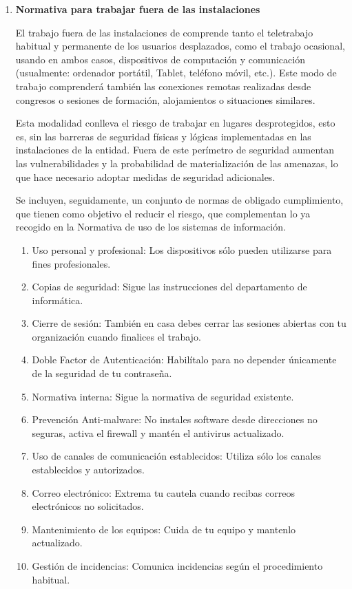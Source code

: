 \begin{enumerate}[label=\alph*)]
\item \textbf{Normativa para trabajar fuera de las instalaciones}

El trabajo fuera de las instalaciones de \Beneficiario{} comprende tanto el teletrabajo habitual y permanente de los usuarios desplazados, como el trabajo ocasional, usando en ambos casos, dispositivos de computación y comunicación (usualmente: ordenador portátil, Tablet, teléfono móvil, etc.). Este modo de trabajo comprenderá también las conexiones remotas realizadas desde congresos o sesiones de formación, alojamientos o situaciones similares.

Esta modalidad conlleva el riesgo de trabajar en lugares desprotegidos, esto es, sin las barreras de seguridad físicas y lógicas implementadas en las instalaciones de la entidad. Fuera de este perímetro de seguridad aumentan las vulnerabilidades y la probabilidad de materialización de las amenazas, lo que hace necesario adoptar medidas de seguridad adicionales.

Se incluyen, seguidamente, un conjunto de normas de obligado cumplimiento, que tienen como objetivo el reducir el riesgo, que complementan lo ya recogido en la Normativa de uso de los sistemas de información.

\begin{enumerate}[label=\arabic*)]
    \item Uso personal y profesional: Los dispositivos sólo pueden utilizarse para fines profesionales.
    \item Copias de seguridad: Sigue las instrucciones del departamento de informática.
    \item Cierre de sesión: También en casa debes cerrar las sesiones abiertas con tu organización cuando finalices el trabajo.
    \item Doble Factor de Autenticación: Habilítalo para no depender únicamente de la seguridad de tu contraseña.
    \item Normativa interna: Sigue la normativa de seguridad existente.
    \item Prevención Anti-malware: No instales software desde direcciones no seguras, activa el firewall y mantén el antivirus actualizado.
    \item Uso de canales de comunicación establecidos: Utiliza sólo los canales establecidos y autorizados.
    \item Correo electrónico: Extrema tu cautela cuando recibas correos electrónicos no solicitados.
    \item Mantenimiento de los equipos: Cuida de tu equipo y mantenlo actualizado.
    \item Gestión de incidencias: Comunica incidencias según el procedimiento habitual.
\end{enumerate}

\end{enumerate}